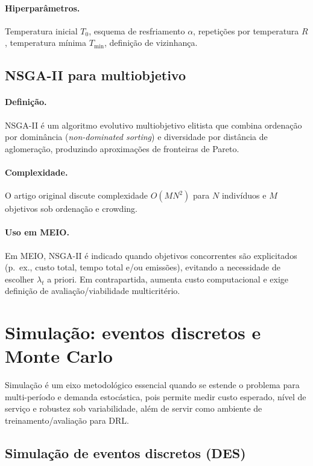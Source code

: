 \paragraph{Hiperparâmetros.}
Temperatura inicial \(T_0\), esquema de resfriamento \(\alpha\), repetições por temperatura \(R\), temperatura mínima \(T_{\min}\), definição de vizinhança. \cite{Kirkpatrick1983SA}

\subsection{NSGA-II para multiobjetivo}

\paragraph{Definição.}
NSGA-II é um algoritmo evolutivo multiobjetivo elitista que combina ordenação por dominância (\emph{non-dominated sorting}) e diversidade por distância de aglomeração, produzindo aproximações de fronteiras de Pareto. \cite{Deb2002NSGA2}

\paragraph{Complexidade.}
O artigo original discute complexidade \(O(MN^2)\) para \(N\) indivíduos e \(M\) objetivos sob ordenação e crowding. \cite{Deb2002NSGA2}

\paragraph{Uso em MEIO.}
Em MEIO, NSGA-II é indicado quando objetivos concorrentes são explicitados (p.\ ex., custo total, tempo total e/ou emissões), evitando a necessidade de escolher \(\lambda_t\) a priori. Em contrapartida, aumenta custo computacional e exige definição de avaliação/viabilidade multicritério.

\section{Simulação: eventos discretos e Monte Carlo}

Simulação é um eixo metodológico essencial quando se estende o problema para multi-período e demanda estocástica, pois permite medir custo esperado, nível de serviço e robustez sob variabilidade, além de servir como ambiente de treinamento/avaliação para DRL. \cite{Law2015SimulationModeling}

\subsection{Simulação de eventos discretos (DES)}

